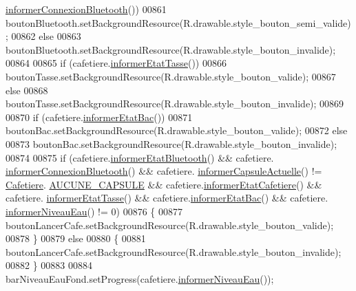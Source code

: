 \begin{DoxyCode}
      \hyperlink{classcom_1_1example_1_1ekawa_1_1_cafetiere_a97d9ca4701a961fe8865ecfa1d5bf64a}{informerConnexionBluetooth}())
00861             boutonBluetooth.setBackgroundResource(R.drawable.style\_bouton\_semi\_valide);
00862         \textcolor{keywordflow}{else}
00863             boutonBluetooth.setBackgroundResource(R.drawable.style\_bouton\_invalide);
00864 
00865         \textcolor{keywordflow}{if} (cafetiere.\hyperlink{classcom_1_1example_1_1ekawa_1_1_cafetiere_ae3c04cc0258cbe554eee5894655c379e}{informerEtatTasse}())
00866             boutonTasse.setBackgroundResource(R.drawable.style\_bouton\_valide);
00867         \textcolor{keywordflow}{else}
00868             boutonTasse.setBackgroundResource(R.drawable.style\_bouton\_invalide);
00869 
00870         \textcolor{keywordflow}{if} (cafetiere.\hyperlink{classcom_1_1example_1_1ekawa_1_1_cafetiere_a1e5aad72cec77a755c8b70eb1be5e6e5}{informerEtatBac}())
00871             boutonBac.setBackgroundResource(R.drawable.style\_bouton\_valide);
00872         \textcolor{keywordflow}{else}
00873             boutonBac.setBackgroundResource(R.drawable.style\_bouton\_invalide);
00874 
00875         \textcolor{keywordflow}{if} (cafetiere.\hyperlink{classcom_1_1example_1_1ekawa_1_1_cafetiere_aeff88ad385713a7897074dcdb76077a5}{informerEtatBluetooth}() && cafetiere.
      \hyperlink{classcom_1_1example_1_1ekawa_1_1_cafetiere_a97d9ca4701a961fe8865ecfa1d5bf64a}{informerConnexionBluetooth}() && cafetiere.
      \hyperlink{classcom_1_1example_1_1ekawa_1_1_cafetiere_a3251d1865f3a4113553e1743a971984d}{informerCapsuleActuelle}() != \hyperlink{classcom_1_1example_1_1ekawa_1_1_cafetiere}{Cafetiere}.
      \hyperlink{classcom_1_1example_1_1ekawa_1_1_cafetiere_a5a23a636fa5f2e5826458e700f453c16}{AUCUNE\_CAPSULE} && cafetiere.\hyperlink{classcom_1_1example_1_1ekawa_1_1_cafetiere_a4253a092cf9c84f7b97021e628d5bfb4}{informerEtatCafetiere}() && cafetiere.
      \hyperlink{classcom_1_1example_1_1ekawa_1_1_cafetiere_ae3c04cc0258cbe554eee5894655c379e}{informerEtatTasse}() && cafetiere.\hyperlink{classcom_1_1example_1_1ekawa_1_1_cafetiere_a1e5aad72cec77a755c8b70eb1be5e6e5}{informerEtatBac}() && cafetiere.
      \hyperlink{classcom_1_1example_1_1ekawa_1_1_cafetiere_ab8113e922056276f8097744991ca76b6}{informerNiveauEau}() != 0)
00876         \{
00877             boutonLancerCafe.setBackgroundResource(R.drawable.style\_bouton\_valide);
00878         \}
00879         \textcolor{keywordflow}{else}
00880         \{
00881             boutonLancerCafe.setBackgroundResource(R.drawable.style\_bouton\_invalide);
00882         \}
00883 
00884         barNiveauEauFond.setProgress(cafetiere.\hyperlink{classcom_1_1example_1_1ekawa_1_1_cafetiere_ab8113e922056276f8097744991ca76b6}{informerNiveauEau}());

\end{DoxyCode}
